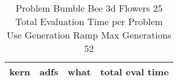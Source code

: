 \begin{table}[H]
\caption{Problem  Bumble Bee 3d  Flowers 25\\Total Evaluation Time per Problem \\ Use Generation Ramp  Max Generations 52\\}
\begin{center}
\scalebox{1.0} %
{
\begin{tabular}{lllr}
\hline
kern & adfs & what & total eval time \\
\hline


\end{tabular}
}
\end{center}
\end{table}

